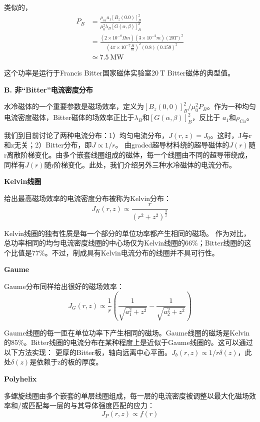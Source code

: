 类似的，
\begin{equation}
\begin{split}
P_B&=\frac{\rho_{cu}a_1[B_z(0.0)]_B^2}{\mu_0^2\lambda_B[G(\alpha,\beta)]_B^2}\\
&=\frac{(2\times 10^{-8}\Omega m)(3\times 10^{-2}m)(20T)^2}{(4\pi\times 10^{-7}\frac{H}{m})^2(0.8)(0.159)^2}\\
&\simeq 7.5\ \mathrm{MW}%
\end{split}
\end{equation}

这个功率是运行于Francis Bitter国家磁体实验室$20\ \mathrm{T}$ Bitter磁体的典型值。

\textbf{B. 非“Bitter”电流密度分布}

水冷磁体的一个重要参数是磁场效率，定义为$[B_z(0,0)]_B^2/\mu_0^2 P_B$。作为一种均匀电流密度磁体，Bitter磁体的场效率正比于$\lambda_B$和$[G(\alpha,\beta)]_B^2$，反比于
$a_1$和$\rho_{Cu}$。

我们到目前讨论了两种电流分布：1）均匀电流分布，$J(r,z)=J_0$。这时，J与r和z无关；2）Bitter分布，即$J\propto 1/r$。
由graded超导材料绕的超导磁体的$J(r)$随r离散阶梯变化。由多个嵌套线圈组成的磁体，每一个线圈由不同的超导带绕成，同样有$J(r)$随r阶梯变化。此处，我们介绍另外三种水冷磁体的电流分布。

\textbf{Kelvin线圈}

给出最高磁场效率的电流密度分布被称为Kelvin分布：
\begin{equation}
J_K(r,z)\propto\frac{r}{(r^2+z^2)^\frac{3}{2}}%
\end{equation}

Kelvin线圈的独有性质是每一个部分的单位功率都产生相同的磁场。
作为对比，总功率相同的均匀电流密度线圈的中心场仅为Kelvin线圈的66\%；Bitter线圈的这个比值是77\%。不过，制成具有Kelvin电流分布的线圈并不具可行性。

\textbf{Gaume}

Gaume分布同样给出很好的磁场效率：
\begin{equation}
J_G(r,z)\propto\frac{1}{r}\left(\frac{1}{\sqrt{a_1^2+z^2}}-\frac{1}{\sqrt{a_2^2+z^2}}\right)%
\end{equation}

Gaume线圈的每一匝在单位功率下产生相同的磁场。Gaume线圈的磁场是Kelvin的85\%。Bitter线圈的电流分布在某种程度上是近似于Gaume线圈的。这可以通过以下方法实现：
更厚的Bitter板，轴向远离中心平面。$J_b(r,z)\propto 1/r\delta(z)$，此处$\delta(z)$是依赖于z的板的厚度。

\textbf{Polyhelix}

多螺旋线圈由多个嵌套的单层线圈组成，每一层的电流密度被调整以最大化磁场效率和/或匹配每一层的与其导体强度匹配的应力：
\begin{equation}
J_P(r,z)\propto f(r)%
\end{equation}

